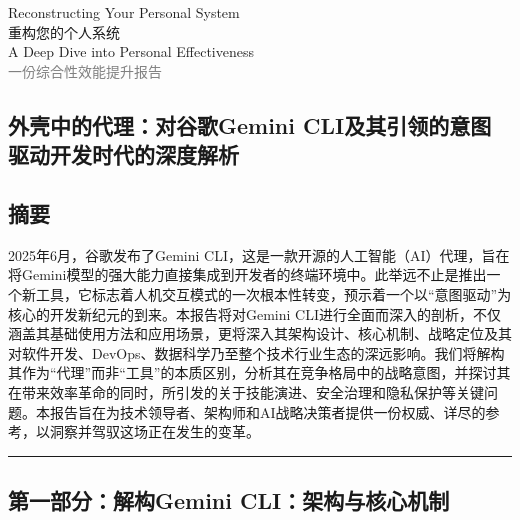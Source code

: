 \documentclass[a4paper,12pt]{article}
\title{\vspace{-2cm}}
\author{}
\date{}
\begin{document}
\begin{center}
    \fontsize{25pt}{30pt}\selectfont  Reconstructing Your Personal System\\
    \fontsize{20pt}{25pt}\selectfont  重构您的个人系统\textbar \\
    \fontsize{12pt}{15pt}\selectfont A Deep Dive into Personal Effectiveness\\
    \fontsize{12pt}{15pt}\selectfont\textcolor{gray}{一份综合性效能提升报告}
\end{center}

\begin{multicols}{2}
    \thispagestyle{firstpage}
    \onehalfspacing

    \section{\texorpdfstring{\textbf{外壳中的代理：对谷歌Gemini
    CLI及其引领的意图驱动开发时代的深度解析}}{外壳中的代理：对谷歌Gemini CLI及其引领的意图驱动开发时代的深度解析}}\label{ux5916ux58f3ux4e2dux7684ux4ee3ux7406ux5bf9ux8c37ux6b4cgemini-cliux53caux5176ux5f15ux9886ux7684ux610fux56feux9a71ux52a8ux5f00ux53d1ux65f6ux4ee3ux7684ux6df1ux5ea6ux89e3ux6790}

    \subsection{\texorpdfstring{\textbf{摘要}}{摘要}}\label{ux6458ux8981}

    2025年6月，谷歌发布了Gemini
    CLI，这是一款开源的人工智能（AI）代理，旨在将Gemini模型的强大能力直接集成到开发者的终端环境中。此举远不止是推出一个新工具，它标志着人机交互模式的一次根本性转变，预示着一个以``意图驱动''为核心的开发新纪元的到来。本报告将对Gemini
    CLI进行全面而深入的剖析，不仅涵盖其基础使用方法和应用场景，更将深入其架构设计、核心机制、战略定位及其对软件开发、DevOps、数据科学乃至整个技术行业生态的深远影响。我们将解构其作为``代理''而非``工具''的本质区别，分析其在竞争格局中的战略意图，并探讨其在带来效率革命的同时，所引发的关于技能演进、安全治理和隐私保护等关键问题。本报告旨在为技术领导者、架构师和AI战略决策者提供一份权威、详尽的参考，以洞察并驾驭这场正在发生的变革。

    \begin{center}\rule{0.5\linewidth}{0.5pt}\end{center}

    \subsection{\texorpdfstring{\textbf{第一部分：解构Gemini
    CLI：架构与核心机制}}{第一部分：解构Gemini CLI：架构与核心机制}}\label{ux7b2cux4e00ux90e8ux5206ux89e3ux6784gemini-cliux67b6ux6784ux4e0eux6838ux5fc3ux673aux5236}


\end{multicols}
\end{document}
